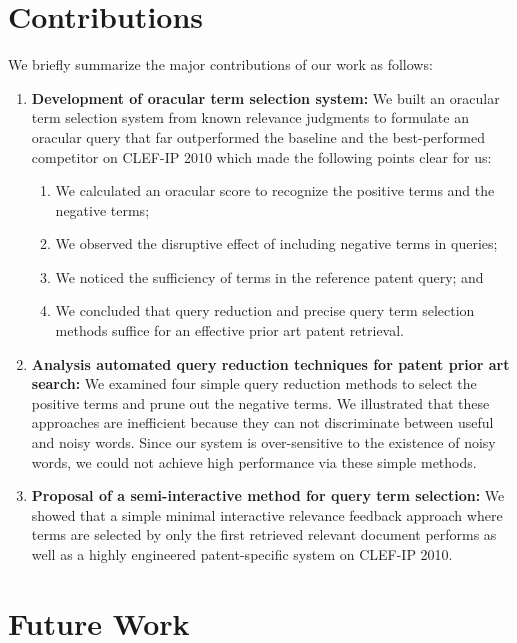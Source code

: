 \section{Contributions}
\label{sec:contributions}
We briefly summarize the major contributions of our work as follows:
\begin{enumerate}
\item \textbf{Development of oracular term selection system: }We built an oracular term selection system from known relevance judgments to formulate an oracular query that far outperformed the baseline and the best-performed competitor on CLEF-IP 2010 which made the following points clear for us:
\begin{enumerate}
\item We calculated an oracular score to recognize the positive terms and the negative terms;
\item We observed the disruptive effect of including negative terms in queries;
\item We noticed the sufficiency of terms in the reference patent query; and 
\item We concluded that query reduction and precise query term selection methods suffice for an effective prior art patent retrieval.
\end{enumerate}
\item \textbf{Analysis automated query reduction techniques for patent prior art search: } We examined four simple query reduction methods to select the positive terms and prune out the negative terms. We illustrated that these approaches are inefficient because they can not discriminate between useful and noisy words. Since our system is over-sensitive to the existence of noisy words, we could not achieve high performance via these simple methods. 
\item \textbf{Proposal of a semi-interactive method for query term selection: }We showed that a simple minimal interactive relevance feedback approach where terms are selected by only the first retrieved relevant document performs as well as a highly engineered patent-specific system on CLEF-IP 2010. 
\end{enumerate}

\section{Future Work}
\label{sec:future}




